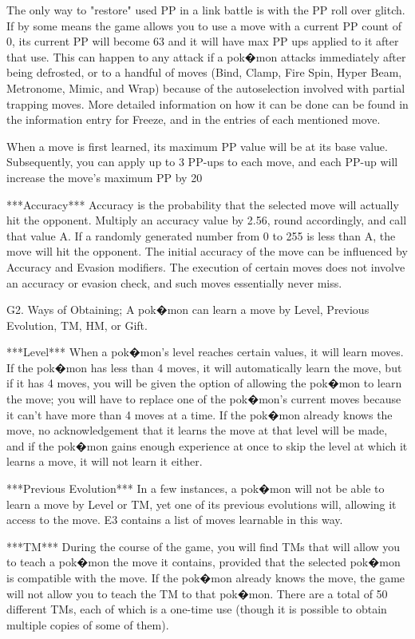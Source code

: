 \documentclass[reprint, aps, prl, paper=A4]{revtex4-1}
\begin{document}
The only way to "restore" used PP in a link battle is with the PP roll over glitch. If by some
means the game allows you to use a move with a current PP count of 0, its current PP will
become 63 and it will have max PP ups applied to it after that use. This can happen to any
attack if a pok�mon attacks immediately after being defrosted, or to a handful of moves (Bind,
Clamp, Fire Spin, Hyper Beam, Metronome, Mimic, and Wrap) because of the autoselection involved
with partial trapping moves. More detailed information on how it can be done can be found in
the information entry for Freeze, and in the entries of each mentioned move.

When a move is first learned, its maximum PP value will be at its base value. Subsequently, you
can apply up to 3 PP-ups to each move, and each PP-up will increase the move's maximum PP by
20%


***Accuracy***
Accuracy is the probability that the selected move will actually hit the opponent. Multiply an
accuracy value by 2.56, round accordingly, and call that value A. If a randomly generated
number from 0 to 255 is less than A, the move will hit the opponent. The initial accuracy of
the move can be influenced by Accuracy and Evasion modifiers. The execution of certain moves
does not involve an accuracy or evasion check, and such moves essentially never miss.


G2. Ways of Obtaining;
A pok�mon can learn a move by Level, Previous Evolution, TM, HM, or Gift.

***Level***
When a pok�mon's level reaches certain values, it will learn moves. If the pok�mon has less
than 4 moves, it will automatically learn the move, but if it has 4 moves, you will be given
the option of allowing the pok�mon to learn the move; you will have to replace one of the
pok�mon's current moves because it can't have more than 4 moves at a time. If the pok�mon
already knows the move, no acknowledgement that it learns the move at that level will be made,
and if the pok�mon gains enough experience at once to skip the level at which it learns a move,
it will not learn it either.

***Previous Evolution***
In a few instances, a pok�mon will not be able to learn a move by Level or TM, yet one of its
previous evolutions will, allowing it access to the move. E3 contains a list of moves learnable
in this way.

***TM***
During the course of the game, you will find TMs that will allow you to teach a pok�mon the
move it contains, provided that the selected pok�mon is compatible with the move. If the
pok�mon already knows the move, the game will not allow you to teach the TM to that pok�mon.
There are a total of 50 different TMs, each of which is a one-time use (though it is possible
to obtain multiple copies of some of them).
\end{document}
